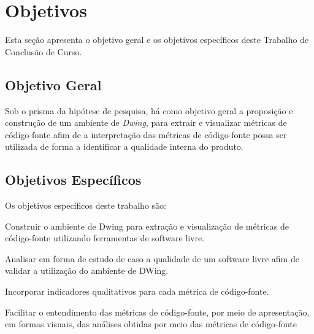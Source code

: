 





\section{Objetivos}

Esta seção apresenta o objetivo geral e os objetivos específicos deste Trabalho de Conclusão de Curso.

\subsection{Objetivo Geral}
Sob o prisma da hipótese de pesquisa, há como objetivo geral a proposição e 
construção de um ambiente de \textit{Dwing}, para extrair e visualizar 
métricas de código-fonte afim de a interpretação das métricas de código-fonte possa ser utilizada de forma a identificar a qualidade interna do produto.



\subsection{Objetivos Específicos}

Os objetivos específicos deste trabalho são:


\begin{objectives}
	\item Construir o ambiente de Dwing para extração e visualização de 
	métricas de código-fonte utilizando ferramentas de software livre. 

	\item Analisar em forma de  estudo de caso a qualidade de um software livre afim de validar a utilização do ambiente de DWing.
  
	\item Incorporar indicadores qualitativos para cada métrica de código-fonte.
	
	\item Facilitar o entendimento das métricas de código-fonte, por meio de 
	apresentação, em formas visuais, das análises obtidas por meio das métricas de código-fonte
	
    \end{objectives}
	


